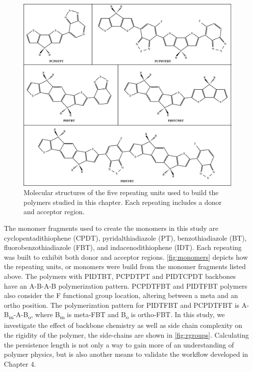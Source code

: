 \newpage
\begin{figure}[h!]
    \centering
    \includegraphics[width=0.9\linewidth]{src/figures/pers_l_figs/monomers.png}
    \caption{Molecular structures of the five repeating units used to build the polymers studied in this chapter. Each repeating includes a donor and acceptor region. }
    \label{fig:monomers}
\end{figure}
\newpage
\par The monomer fragments used to create the monomers in this study are cyclopentadithiophene (CPDT), pyridalthiadiazole (PT), benzothiadiazole (BT), fluorobenzothiadiazole (FBT), and indacenodithiophene (IDT). Each repeating was built to exhibit both donor and acceptor regions. \autoref{fig:monomers} depicts how the repeating units, or monomers were build from the monomer fragments listed above. The polymers with PIDTBT, PCPDTPT and PIDTCPDT backbones have an A-B-A-B polymerization pattern. PCPDTFBT and PIDTFBT polymers also consider the F functional group location, altering between a meta and an ortho position. The polymerization pattern for PIDTFBT and PCPDTFBT is A-B\textsubscript{m}-A-B\textsubscript{o}, where B\textsubscript{m} is meta-FBT and B\textsubscript{o} is ortho-FBT.  In this study, we investigate the effect of backbone chemistry as well as side chain complexity on the rigidity of the polymer, the side-chains are shown in \autoref{fig:rgroups}. Calculating the persistence length is not only a way to gain more of an understanding of polymer physics, but is also another means to validate the workflow developed in Chapter 4. 
